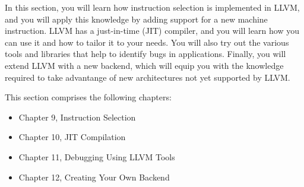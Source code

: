 In this section, you will learn how instruction selection is implemented in LLVM, and you will apply this knowledge by adding support for a new machine instruction. LLVM has a just-in-time (JIT) compiler, and you will learn how you can use it and how to tailor it to your needs. You will also try out the various tools and libraries that help to identify bugs in applications. Finally, you will extend LLVM with a new backend, which will equip you with the knowledge required to take advantange of new architectures not yet supported by LLVM. \par

This section comprises the following chapters:\par

\begin{itemize}
	\item Chapter 9, Instruction Selection
	\item Chapter 10, JIT Compilation
	\item Chapter 11, Debugging Using LLVM Tools
	\item Chapter 12, Creating Your Own Backend
\end{itemize}

\newpage